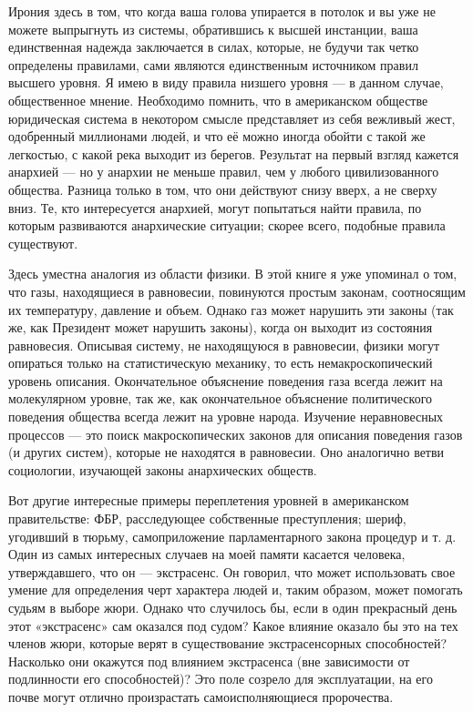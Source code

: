 \documentclass[../main.tex]{subfiles}
\begin{document}
Ирония здесь в том, что когда ваша голова упирается в потолок и вы уже не можете выпрыгнуть из системы, обратившись к высшей инстанции, ваша единственная надежда заключается в силах, которые, не будучи так четко определены правилами, сами являются единственным источником правил высшего уровня. Я имею в виду правила низшего уровня --- в данном случае, общественное мнение. Необходимо помнить, что в американском обществе юридическая система в некотором смысле представляет из себя вежливый жест, одобренный миллионами людей, и что её можно иногда обойти с такой же легкостью, с какой река выходит из берегов. Результат на первый взгляд кажется анархией --- но у анархии не меньше правил, чем у любого цивилизованного общества. Разница только в том, что они действуют снизу вверх, а не сверху вниз. Те, кто интересуется анархией, могут попытаться найти правила, по которым развиваются анархические ситуации; скорее всего, подобные правила существуют.

Здесь уместна аналогия из области физики. В этой книге я уже упоминал о том, что газы, находящиеся в равновесии, повинуются простым законам, соотносящим их температуру, давление и объем. Однако газ может нарушить эти законы (так же, как Президент может нарушить законы), когда он выходит из состояния равновесия. Описывая систему, не находящуюся в равновесии, физики могут опираться только на статистическую механику, то есть немакроскопический уровень описания. Окончательное объяснение поведения газа всегда лежит на молекулярном уровне, так же, как окончательное объяснение политического поведения общества всегда лежит на уровне народа. Изучение неравновесных процессов --- это поиск макроскопических законов для описания поведения газов (и других систем), которые не находятся в равновесии. Оно аналогично ветви социологии, изучающей законы анархических обществ.

Вот другие интересные примеры переплетения уровней в американском правительстве: ФБР, расследующее собственные преступления; шериф, угодивший в тюрьму, самоприложение парламентарного закона процедур и т. д. Один из самых интересных случаев на моей памяти касается человека, утверждавшего, что он --- экстрасенс. Он говорил, что может использовать свое умение для определения черт характера людей и, таким образом, может помогать судьям в выборе жюри. Однако что случилось бы, если в один прекрасный день этот «экстрасенс» сам оказался под судом? Какое влияние оказало бы это на тех членов жюри, которые верят в существование экстрасенсорных способностей? Насколько они окажутся под влиянием экстрасенса (вне зависимости от подлинности его способностей)? Это поле созрело для эксплуатации, на его почве могут отлично произрастать самоисполняющиеся пророчества.
\end{document}

